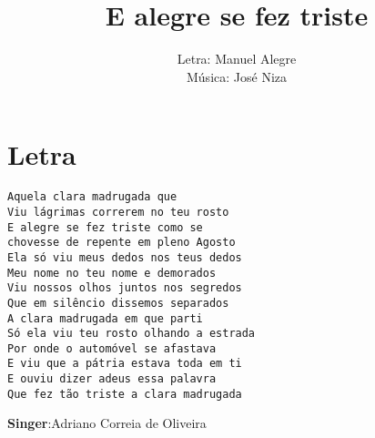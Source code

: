 \documentclass[12pt,a4paper]{article}
\begin{document}
\title{E alegre se fez triste}
\author{Letra: Manuel Alegre\\Música: José Niza\\}
\date{}
\maketitle
\section*{Letra}
\begin{verbatim}Aquela clara madrugada que
Viu lágrimas correrem no teu rosto
E alegre se fez triste como se
chovesse de repente em pleno Agosto
Ela só viu meus dedos nos teus dedos
Meu nome no teu nome e demorados
Viu nossos olhos juntos nos segredos
Que em silêncio dissemos separados
A clara madrugada em que parti
Só ela viu teu rosto olhando a estrada
Por onde o automóvel se afastava
E viu que a pátria estava toda em ti
E ouviu dizer adeus essa palavra
Que fez tão triste a clara madrugada
\end{verbatim}\begin{flushright}
\textbf{Singer}:Adriano Correia de Oliveira
\end{flushright}
\end{document}
